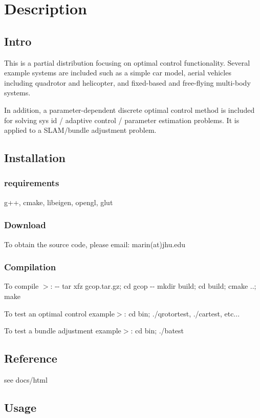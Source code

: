 \section{\-Description}\label{index_Description}
\subsection{\-Intro}\label{index_Intro}
\-This is a partial distribution focusing on optimal control functionality. \-Several example systems are included such as a simple car model, aerial vehicles including quadrotor and helicopter, and fixed-\/based and free-\/flying multi-\/body systems.

\-In addition, a parameter-\/dependent discrete optimal control method is included for solving sys id / adaptive control / parameter estimation problems. \-It is applied to a \-S\-L\-A\-M/bundle adjustment problem.\subsection{\-Installation}\label{index_Installation}
\subsubsection{requirements}\label{index_Build}
g++, cmake, libeigen, opengl, glut\subsubsection{\-Download}\label{index_Download}
\-To obtain the source code, please email\-: marin(at)jhu.\-edu\subsubsection{\-Compilation}\label{index_Compilation}

\begin{DoxyItemize}
\item \-To compile $>$\-: -\/-\/ tar xfz gcop.\-tar.\-gz; cd gcop -\/-\/ mkdir build; cd build; cmake ..; make
\item \-To test an optimal control example$>$\-: cd bin; ./qrotortest, ./cartest, etc...
\item \-To test a bundle adjustment example$>$\-: cd bin; ./batest
\end{DoxyItemize}\subsection{\-Reference}\label{index_API}
see docs/html\subsection{\-Usage}\label{index_Usage}
